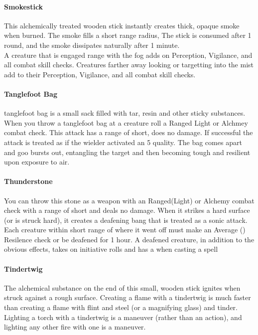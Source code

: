 \begin{multicols}{2}
\paragraph{Smokestick} \label{alcitm:smokestick}
This alchemically treated wooden stick instantly creates
thick, opaque smoke when burned. The smoke fills a
short range radius, The stick is consumed after 1 round,
and the smoke dissipates naturally after 1 minute.\\
A creature that is engaged range with the fog adds
\setback on Perception, Vigilance, and all combat skill
checks. Creatures farther away looking or targetting into
the mist add \setback\setback to their Perception, Vigilance,
and all combat skill checks.

\paragraph{Tanglefoot Bag} \label{alcitm:tanglefootbag}
tanglefoot bag is a small sack filled with tar, resin
and other sticky substances. When you throw a
tanglefoot bag at a creature roll a Ranged Light or
Alchmey combat check. This attack has a range of
short, does no damage. If successful the attack is treated
as if the wielder activated an  5 quality. The
bag comes apart and goo bursts out, entangling the
target and then becoming tough and resilient upon
exposure to air.

\paragraph{Thunderstone} \label{alcitm:thunderstone}
You can throw this stone as a weapon with an Ranged(Light) or
Alchemy combat check with a range of short and deals no damage.
When it strikes a hard surface (or is struck hard), it creates
a deafening bang that is treated as a sonic attack. Each creature
within short range of where it went off must make an Average
(\difficulty\difficulty) Resilence check or be deafened for 1
hour. A deafened creature, in addition to the obvious effects,
takes \setback\setback on initiative rolls and has a \setback
when casting a spell

\paragraph{Tindertwig} \label{alcitm:tindertwig}
The alchemical substance on the end of this small,
wooden stick ignites when struck against a rough
surface. Creating a flame with a tindertwig is much
faster than creating a flame with flint and steel (or a
magnifying glass) and tinder. Lighting a torch with a
tindertwig is a maneuver (rather than an action), and
lighting any other fire with one is a maneuver.

\end{multicols}
\hrulefill

